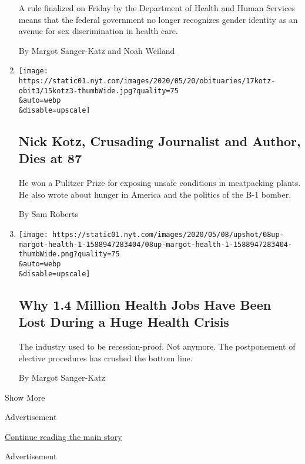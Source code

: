 \begin{enumerate}
  A rule finalized on Friday by the Department of Health and Human
  Services means that the federal government no longer recognizes gender
  identity as an avenue for sex discrimination in health care.

  By Margot Sanger-Katz and Noah Weiland
\item
  \href{/2020/05/15/business/media/nick-kotz-dead.html}{}

  \texttt{[image: https://static01.nyt.com/images/2020/05/20/obituaries/17kotz-obit3/15kotz3-thumbWide.jpg?quality=75\\\&auto=webp\\\&disable=upscale]}

  \hypertarget{nick-kotz-crusading-journalist-and-author-dies-at-87}{%
  \subsection{Nick Kotz, Crusading Journalist and Author, Dies at
  87}\label{nick-kotz-crusading-journalist-and-author-dies-at-87}}

  He won a Pulitzer Prize for exposing unsafe conditions in meatpacking
  plants. He also wrote about hunger in America and the politics of the
  B-1 bomber.

  By Sam Roberts
\item
  \href{/2020/05/08/upshot/health-jobs-plummeting-virus.html}{}

  \texttt{[image: https://static01.nyt.com/images/2020/05/08/upshot/08up-margot-health-1-1588947283404/08up-margot-health-1-1588947283404-thumbWide.png?quality=75\\\&auto=webp\\\&disable=upscale]}

  \hypertarget{why-14-million-health-jobs-have-been-lost-during-a-huge-health-crisis}{%
  \subsection{Why 1.4 Million Health Jobs Have Been Lost During a Huge
  Health
  Crisis}\label{why-14-million-health-jobs-have-been-lost-during-a-huge-health-crisis}}

  The industry used to be recession-proof. Not anymore. The postponement
  of elective procedures has crushed the bottom line.

  By Margot Sanger-Katz
\end{enumerate}

Show More

Advertisement

\protect\hyperlink{after-mid1}{Continue reading the main story}

Advertisement

